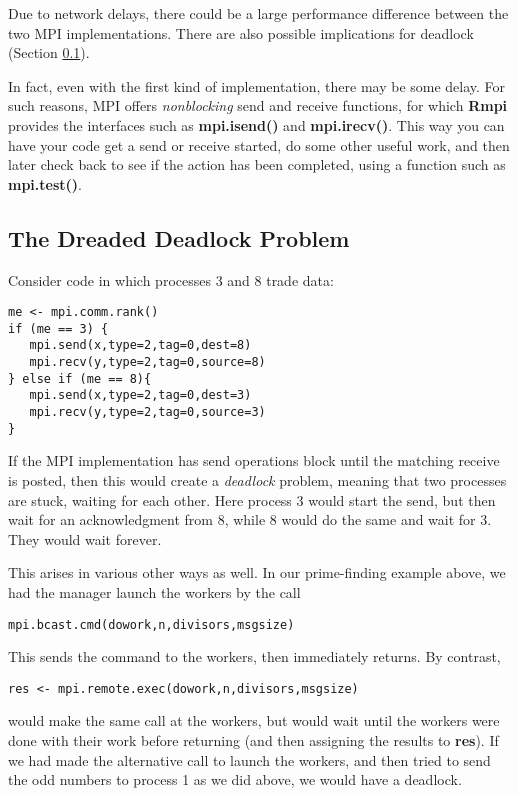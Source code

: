 Due to network delays, there could be a large performance difference
between the two MPI implementations.  There are also possible
implications for deadlock (Section \ref{deadlock}).

In fact, even with the first kind of implementation, there may be some
delay.  For such reasons, MPI offers {\it nonblocking} send and receive
functions, for which {\bf Rmpi} provides the interfaces such as {\bf
mpi.isend()} and {\bf mpi.irecv()}.  This way you can have your code get
a send or receive started, do some other useful work, and then later
check back to see if the action has been completed, using a function
such as {\bf mpi.test()}.

\subsection{The Dreaded Deadlock Problem}
\label{deadlock}

Consider code in which processes 3 and 8 trade data:

\begin{lstlisting}
me <- mpi.comm.rank()
if (me == 3) {
   mpi.send(x,type=2,tag=0,dest=8)
   mpi.recv(y,type=2,tag=0,source=8)
} else if (me == 8){
   mpi.send(x,type=2,tag=0,dest=3)
   mpi.recv(y,type=2,tag=0,source=3)
}
\end{lstlisting}

If the MPI implementation has send operations block until
the matching receive is posted, then this would create a {\it deadlock}
problem, meaning that two processes are stuck, waiting for each
other.  Here process 3 would start the send, but then wait for an
acknowledgment from 8, while 8 would do the same and wait for 3.  They
would wait forever.

This arises in various other ways as well.  In our prime-finding example
above, we had the manager launch the workers by the call

\begin{lstlisting}
mpi.bcast.cmd(dowork,n,divisors,msgsize)
\end{lstlisting}

This sends the command to the workers, then immediately returns.  By
contrast,

\begin{lstlisting}
res <- mpi.remote.exec(dowork,n,divisors,msgsize)
\end{lstlisting}

would make the same call at the workers, but would wait until the
workers were done with their work before returning (and then assigning
the results to {\bf res}).  If we had made the alternative call to
launch the workers, and then tried to send the odd numbers to process 1
as we did above, we would have a deadlock.

